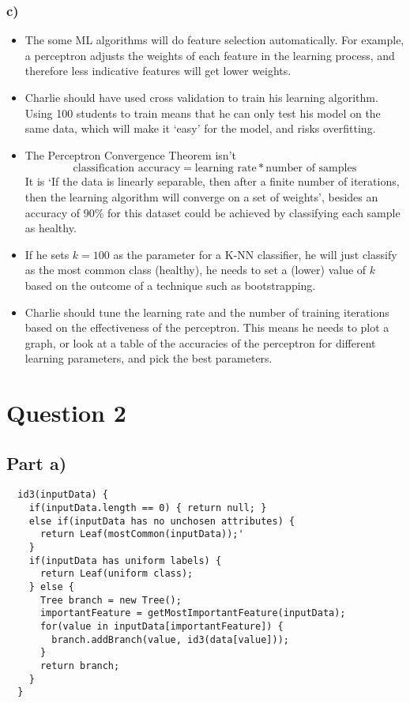 \documentclass{article}
\begin{document}
\subsubsection*{c)}

\begin{itemize}
  \item The some ML algorithms will do feature selection automatically. For
    example, a perceptron adjusts the weights of each feature in the learning
    process, and therefore less indicative features will get lower weights.
  \item Charlie should have used cross validation to train his learning
    algorithm. Using 100 students to train means that he can only test his
    model on the same data, which will make it `easy' for the model, and risks
    overfitting.
  \item The Perceptron Convergence Theorem isn't 
    \[
      \text{classification accuracy} = \text{learning rate} * \text{number of samples}
    \]
    It is `If the data is linearly separable, then after a finite number of
    iterations, then the learning algorithm will converge on a set of weights',
    besides an accuracy of 90\% for this dataset could be achieved by
    classifying each sample as healthy.
  \item If he sets $k = 100$ as the parameter for a K-NN classifier, he will
    just classify as the most common class (healthy), he needs to set a (lower)
    value of $k$ based on the outcome of a technique such as bootstrapping.
  \item Charlie should tune the learning rate and the number of training
    iterations based on the effectiveness of the perceptron. This means he needs
    to plot a graph, or look at a table of the accuracies of the perceptron for
    different learning parameters, and pick the best parameters.
\end{itemize}

\section*{Question 2}

\subsection*{Part a)}

\begin{verbatim}
  id3(inputData) {
    if(inputData.length == 0) { return null; }
    else if(inputData has no unchosen attributes) {
      return Leaf(mostCommon(inputData));'
    }
    if(inputData has uniform labels) {
      return Leaf(uniform class);
    } else {
      Tree branch = new Tree();
      importantFeature = getMostImportantFeature(inputData);
      for(value in inputData[importantFeature]) {
        branch.addBranch(value, id3(data[value]));
      }
      return branch;
    }
  }
\end{verbatim}
\end{document}
